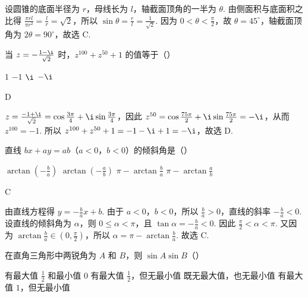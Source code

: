 \begin{solution}
设圆锥的底面半径为 \(r\)，母线长为 \(l\)，轴截面顶角的一半为
\(\theta\). 由侧面积与底面积之比得
\(\frac{\pi rl}{\pi r^2}=\frac{l}{r}=\sqrt{2}\)，所以
\(\sin\theta=\frac{r}{l}=\frac{1}{\sqrt{2}}\). 因为
\(0<\theta<\frac{\pi}{2}\)，故 \(\theta=45^\circ\)，轴截面顶角为
\(2\theta=90^\circ\)，故选 C.
\end{solution}

\begin{problem}
当 \(z = -\frac{1 - \i}{\sqrt{2}}\) 时，\(z^{100} + z^{50} + 1\) 的值等于（\quad）

\choices
    {\(1\)}
    {\(-1\)}
    {\(\i\)}
    {\(-\i\)}
\end{problem}

\begin{answer}
D
\end{answer}

\begin{solution}
\(z=\frac{-1+\i}{\sqrt{2}}=\cos\frac{3\pi}{4}+\i\sin\frac{3\pi}{4}\)，因此
\(z^{50}=\cos\frac{75\pi}{2}+\i\sin\frac{75\pi}{2}=-\i\)，从而
\(z^{100}=-1\). 所以
\(z^{100}+z^{50}+1=-1-\i+1=-\i\)，故选 D.
\end{solution}

\begin{problem}
直线 \(bx + ay = ab\)（\(a < 0\)，\(b < 0\)）的倾斜角是（\quad）

\choices
    {\(\arctan \left(-\frac{b}{a}\right)\)}
    {\(\arctan \left(-\frac{a}{b}\right)\)}
    {\(\pi - \arctan \frac{b}{a}\)}
    {\(\pi - \arctan \frac{a}{b}\)}
\end{problem}

\begin{answer}
C
\end{answer}

\begin{solution}
由直线方程得 \(y=-\frac{b}{a}x+b\). 由于 \(a<0\)，\(b<0\)，所以
\(\frac{b}{a}>0\)，直线的斜率 \(-\frac{b}{a}<0\). 设直线的倾斜角为
\(\alpha\)，则 \(0\leqslant\alpha<\pi\)，且 \(\tan\alpha=-\frac{b}{a}<0\).
因此 \(\frac{\pi}{2}<\alpha<\pi\). 又因为
\(\arctan\frac{b}{a}\in\left(0,\frac{\pi}{2}\right)\)，所以
\(\alpha=\pi-\arctan\frac{b}{a}\).
故选 C.
\end{solution}

\begin{problem}
在直角三角形中两锐角为 \(A\) 和 \(B\)，则 \(\sin A \sin B\)（\quad）

\choices
    {有最大值 \(\frac{1}{2}\) 和最小值 \(0\)}
    {有最大值 \(\frac{1}{2}\)，但无最小值}
    {既无最大值，也无最小值}
    {有最大值 \(1\)，但无最小值}
\end{problem}


